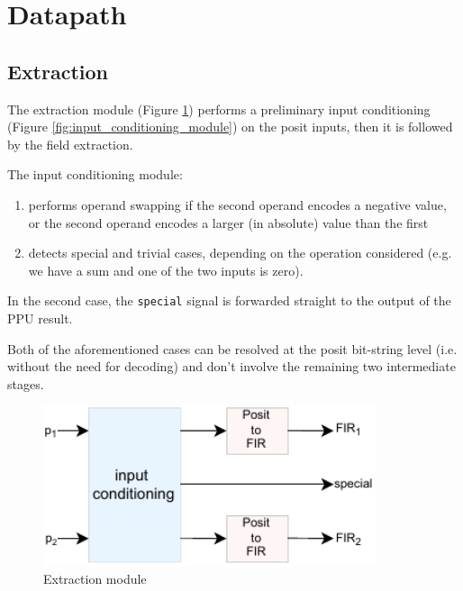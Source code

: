 \section{Datapath}

\subsection{Extraction}\label{sec:posit_extraction}

The extraction module (Figure \ref{fig:extraction_ppu}) performs a preliminary input conditioning (Figure \ref{fig:input_conditioning_module}) on the posit inputs, then it is followed by the field extraction.

The input conditioning module:
\begin{enumerate}
    \item performs operand swapping if the second operand encodes a negative value, or the second operand encodes a larger (in absolute) value than the first 
    \item detects special and trivial cases, depending on the operation considered (e.g. we have a sum and one of the two inputs is zero).
\end{enumerate} 

In the second case, the \texttt{special} signal is forwarded straight to the output of the PPU result. 

Both of the aforementioned cases can be resolved at the posit bit-string level (i.e. without the need for decoding) and don't involve the remaining two intermediate stages.

\begin{figure}
    \centering
    \includegraphics[width=0.87\textwidth]{figures/extraction.drawio.pdf}
    \caption{Extraction module}
    \label{fig:extraction_ppu}
\end{figure}

